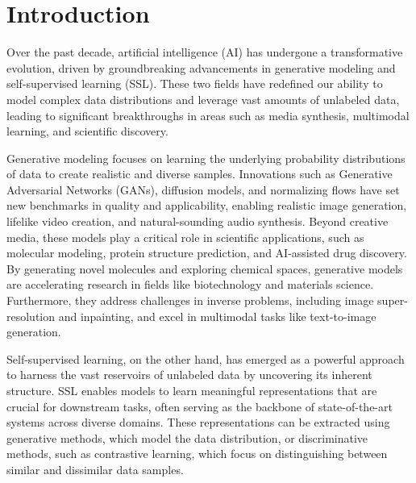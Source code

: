 
\chapter{Introduction}

Over the past decade, artificial intelligence (AI) has undergone a transformative evolution, driven by groundbreaking advancements in generative modeling and self-supervised learning (SSL). These two fields have redefined our ability to model complex data distributions and leverage vast amounts of unlabeled data, leading to significant breakthroughs in areas such as media synthesis, multimodal learning, and scientific discovery.

Generative modeling focuses on learning the underlying probability distributions of data to create realistic and diverse samples. Innovations such as Generative Adversarial Networks (GANs), diffusion models, and normalizing flows have set new benchmarks in quality and applicability, enabling realistic image generation, lifelike video creation, and natural-sounding audio synthesis. Beyond creative media, these models play a critical role in scientific applications, such as molecular modeling, protein structure prediction, and AI-assisted drug discovery. By generating novel molecules and exploring chemical spaces, generative models are accelerating research in fields like biotechnology and materials science. Furthermore, they address challenges in inverse problems, including image super-resolution and inpainting, and excel in multimodal tasks like text-to-image generation.

Self-supervised learning, on the other hand, has emerged as a powerful approach to harness the vast reservoirs of unlabeled data by uncovering its inherent structure. SSL enables models to learn meaningful representations that are crucial for downstream tasks, often serving as the backbone of state-of-the-art systems across diverse domains. These representations can be extracted using generative methods, which model the data distribution, or discriminative methods, such as contrastive learning, which focus on distinguishing between similar and dissimilar data samples. 

